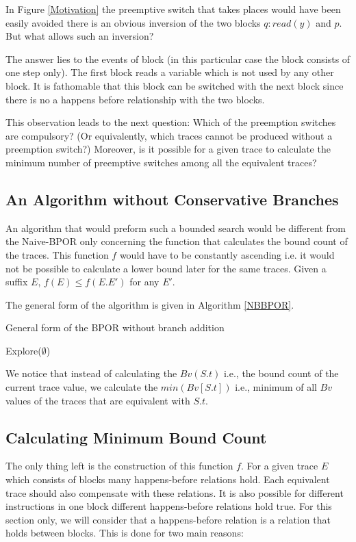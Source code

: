 In Figure \ref{Motivation} the preemptive switch that takes places would have been easily avoided there is an obvious inversion of the two blocks $q:read(y)$ and $p$.
But what allows such an inversion?

The answer lies to the events of block (in this particular case the block consists of one step only). The first block reads a variable which is not used by any other block. 
It is fathomable that this block can be switched with the
next block since there is no a happens before relationship with the two blocks.

This observation leads to the next question: Which of the preemption switches are compulsory? (Or equivalently, which traces cannot be produced without a preemption switch?)
Moreover, is it possible for a given trace to calculate the minimum number of preemptive switches among all the equivalent traces?

\subsection{An Algorithm without Conservative Branches}
An algorithm that would preform such a bounded search would be different from the Naive-BPOR only concerning the function that calculates the bound count 
of the traces. This function $f$ would have to be constantly ascending i.e. it would not be possible to calculate a lower bound later for the same traces.
Given a suffix $E$, $f(E) \leq f(E.E')$ for any $E'$.

The general form of the algorithm is given in Algorithm \ref{NBBPOR}.

\begin{algorithm}[H]
    \SetAlgoLined
    \caption{General form of the BPOR without branch addition}
    \label{NBBPOR}
    Explore($\emptyset$)\;
\end{algorithm}

We notice that instead of calculating the $Bv(S.t)$ i.e., the bound count of the current trace value, 
we calculate the $min(Bv[S.t])$ i.e., minimum of all $Bv$ values of the traces that are equivalent with $S.t$.

\subsection{Calculating Minimum Bound Count}
The only thing left is the construction of this function $f$.
For a given trace $E$ which consists of blocks many happens-before relations hold. Each equivalent trace should also compensate with these relations.
It is also possible for different instructions in one block different happens-before relations hold true. For this section only, we will consider that 
a happens-before relation is a relation that holds between blocks. This is done for two main reasons:

